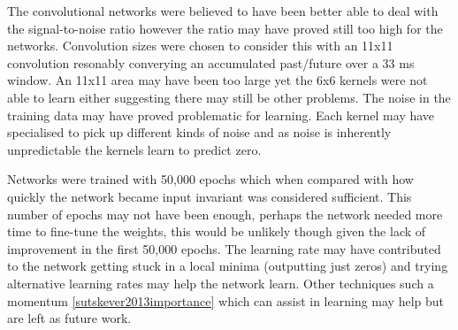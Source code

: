 The convolutional networks were believed to have been better able to deal with the signal-to-noise ratio however the ratio may have proved still too high for the networks.
Convolution sizes were chosen to consider this with an 11x11 convolution resonably converying an accumulated past/future over a 33 ms window. 
An 11x11 area may have been too large yet the 6x6 kernels were not able to learn either suggesting there may still be other problems.
The noise in the training data may have proved problematic for learning. 
Each kernel may have specialised to pick up different kinds of noise and as noise is inherently unpredictable the kernels learn to predict zero. 

Networks were trained with 50,000 epochs which when compared with how quickly the network became input invariant was considered sufficient.
This number of epochs may not have been enough, perhaps the network needed more time to fine-tune the weights, this would be unlikely though given the lack of improvement in the first 50,000 epochs. 
The learning rate may have contributed to the network getting stuck in a local minima (outputting just zeros) and trying alternative learning rates may help the network learn.
Other techniques such a momentum \ref{sutskever2013importance} which can assist in learning may help but are left as future work.






























